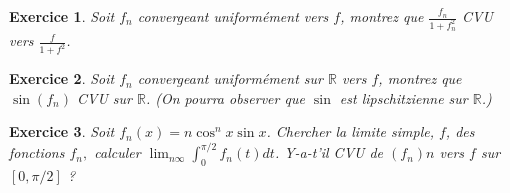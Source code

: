 \documentclass[12pt,a4paper]{article}
\newcommand{\R}{\mathbb{R}}
\theoremstyle{break}
\theoremstyle{break}
\newtheorem{Exo}{Exercice}
\begin{document}


\begin{Exo}
	Soit $f_{n}$ convergeant uniform\'{e}ment vers $f$, montrez que $\frac{f_{n}}{1+f_{n}^{2}}$ CVU vers $\frac{f}{1+f^{2}}$.
\end{Exo}

\begin{Exo}
	Soit $f_{n}$ convergeant uniform\'{e}ment sur $\R$ vers $f$, montrez que $\sin \left( f_{n}\right)$ CVU sur $\R$. (On pourra observer que $\sin$ est lipschitzienne sur $\R$.)
\end{Exo}



\begin{Exo}
	Soit $f_{n}(x)=n\cos ^{n}x\sin x$. Chercher la limite simple, $f$, des
	fonctions $f_{n},$ calculer $\lim_{n\infty}\int_{0}^{\pi/2}f_{n}(t)dt$.
	Y-a-t'il CVU de $(f_n)n$ vers $f$ sur $[0,\pi/2]$ ? 
\end{Exo}

\end{document}

